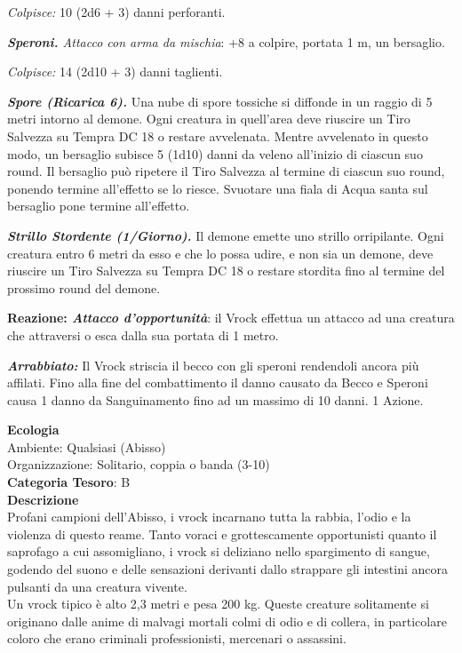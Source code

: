 \begin{multicols}{2}
{\emph{Colpisce:} 10 (2d6 + 3) danni perforanti.

\emph{\textbf{Speroni.} Attacco con arma da mischia}: +8 a colpire, portata 1 m, un bersaglio.

\emph{Colpisce:} 14 (2d10 + 3) danni taglienti.

\emph{\textbf{Spore (Ricarica 6).}} Una nube di spore tossiche si diffonde in un raggio di 5 metri intorno al demone. Ogni creatura in quell'area deve riuscire un Tiro Salvezza su Tempra DC 18 o restare avvelenata. Mentre avvelenato in questo modo, un bersaglio subisce 5 (1d10) danni da veleno all'inizio di ciascun suo round. Il bersaglio può ripetere il Tiro Salvezza al termine di ciascun suo round, ponendo termine all'effetto se lo riesce. Svuotare una fiala di Acqua santa sul bersaglio pone termine all'effetto.

\emph{\textbf{Strillo Stordente (1/Giorno).}} Il demone emette uno strillo orripilante. Ogni creatura entro 6 metri da esso e che lo possa udire, e non sia un demone, deve riuscire un Tiro Salvezza su Tempra DC 18 o restare stordita fino al termine del prossimo round del demone.

\textbf{Reazione: \emph{Attacco d'opportunità}}: il Vrock effettua un attacco ad una creatura che attraversi o esca dalla sua portata di 1 metro.

\emph{\textbf{Arrabbiato:}} Il Vrock striscia il becco con gli speroni rendendoli ancora più affilati. Fino alla fine del combattimento il danno causato da Becco e Speroni causa 1 danno da Sanguinamento fino ad un massimo di 10 danni. 1 Azione.

\textbf{Ecologia}\\
Ambiente: Qualsiasi (Abisso)\\
Organizzazione: Solitario, coppia o banda (3-10)\\
\textbf{Categoria Tesoro}: B\\
\textbf{Descrizione}\\
Profani campioni dell'Abisso, i vrock incarnano tutta la rabbia, l'odio e la violenza di questo reame. Tanto voraci e grottescamente opportunisti quanto il saprofago a cui assomigliano, i vrock si deliziano nello spargimento di sangue, godendo del suono e delle sensazioni derivanti dallo strappare gli intestini ancora pulsanti da una creatura vivente.\\
Un vrock tipico è alto 2,3 metri e pesa 200 kg. Queste creature solitamente si originano dalle anime di malvagi mortali colmi di odio e di collera, in particolare coloro che erano criminali professionisti, mercenari o assassini.

}
\end{multicols}
